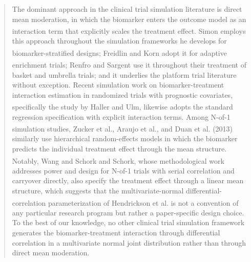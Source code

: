 \documentclass[
  11pt,
]{article}
\newenvironment{orig}{%
  \begin{quote}\normalsize\color[gray]{0.55}}{%
  \end{quote}}
\begin{document}
\begin{orig}
The dominant approach in the clinical trial simulation literature is
direct mean moderation, in which the biomarker enters the outcome model
as an interaction term that explicitly scales the treatment effect.
Simon\textsuperscript{} employs this approach
throughout the simulation frameworks he develops for
biomarker-stratified designs; Freidlin and
Korn\textsuperscript{} adopt it for
adaptive enrichment trials; Renfro and
Sargent\textsuperscript{} use it throughout
their treatment of basket and umbrella trials; and it underlies the
platform trial literature without exception. Recent simulation work on
biomarker-treatment interaction estimation in randomized trials with
prognostic covariates, specifically the study by Haller and
Ulm\textsuperscript{}, likewise adopts the
standard regression specification with explicit interaction terms. Among
N-of-1 simulation studies, Zucker et
al.\textsuperscript{}, Araujo et
al.\textsuperscript{}, and Duan et al.
(2013) similarly use hierarchical random-effects models in which the
biomarker predicts the individual treatment effect through the mean
structure. Notably, Wang and
Schork\textsuperscript{} and
Schork\textsuperscript{}, whose
methodological work addresses power and design for N-of-1 trials with
serial correlation and carryover directly, also specify the treatment
effect through a linear mean structure, which suggests that the
multivariate-normal differential-correlation parameterization of
Hendrickson et al.\textsuperscript{}
is not a convention of any particular research program but rather a
paper-specific design choice. To the best of our knowledge, no other
clinical trial simulation framework generates the biomarker-treatment
interaction through differential correlation in a multivariate normal
joint distribution rather than through direct mean moderation.

\end{orig}
\end{document}
